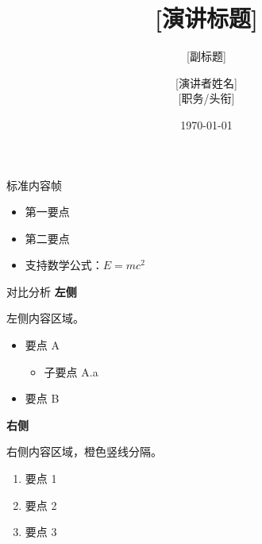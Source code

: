 \title{[演讲标题]}
\subtitle{[副标题]}
\author{[演讲者姓名] \texorpdfstring{\\}{} [职务/头衔]}
\date{\today}



\CustomTitlePage

\begin{frame}{标准内容帧}
  \begin{itemize}
    \item 第一要点
    \item 第二要点
    \item 支持数学公式：$E = mc^2$
  \end{itemize}
\end{frame}

\begin{SplitFrame}{对比分析}
  \textbf{左侧}

  左侧内容区域。
  \begin{itemize}
    \item 要点 A
    \begin{itemize}
      \item 子要点 A.a
    \end{itemize}
    \item 要点 B
  \end{itemize}

  \nextcolumn

  \textbf{右侧}

  右侧内容区域，橙色竖线分隔。
  \begin{enumerate}
    \item 要点 1
    \item 要点 2
    \item 要点 3
  \end{enumerate}
\end{SplitFrame}





